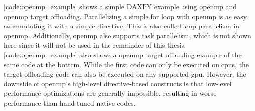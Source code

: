 \autoref{code:openmp_example} shows a simple DAXPY example using \gls{openmp} and \gls{openmp} target offloading. 
Parallelizing a simple for loop with \gls{openmp} is as easy as annotating it with a simple  directive. 
This is also called loop parallelism in \gls{openmp}. 
Additionally, \gls{openmp} also supports task parallelism, which is not shown here since it will not be used in the remainder of this thesis. 
\autoref{code:openmp_example} also shows a \gls{openmp} target offloading example of the same code at the bottom. 
While the first code can only be executed on \glspl{cpu}, the target offloading code can also be executed on any supported \gls{gpu}. 
However, the downside of \gls{openmp}'s high-level directive-based constructs is that low-level performance optimizations are generally impossible, resulting in worse performance than hand-tuned native codes. 


